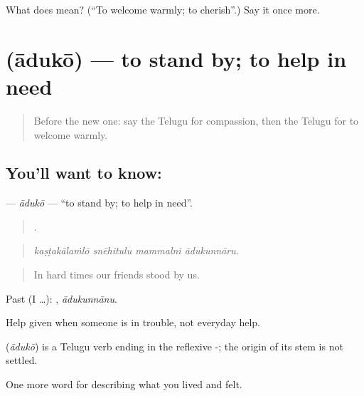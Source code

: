 \begin{tcolorbox}[breakable,colback=teal!4,colframe=teal!35!black,title={Before you move on}]
What does  mean? (\textquotedblleft{}To welcome warmly; to cherish\textquotedblright{}.) Say it once more.
\end{tcolorbox}
\section[\texorpdfstring{\te{ఆదుకో} (ādukō)}{ఆదుకో (ādukō)}]{ (ādukō) — to stand by; to help in need}

\label{lesson:TE-C505-aduko}



\begin{quote}
Before the new one: say the Telugu for compassion, then the Telugu for to welcome warmly.
\end{quote}

\subsection*{You'll want to know: }
\textbf{} — \emph{ādukō} — \textquotedblleft{}to stand by; to help in need\textquotedblright{}.

\begin{quote}
   .
\end{quote}

\begin{quote}
\emph{kaṣṭakālaṁlō snēhitulu mammalni ādukunnāru.}
\end{quote}

\begin{quote}
In hard times our friends stood by us.
\end{quote}

Past (I …): , \emph{ādukunnānu}.

Help given when someone is in trouble, not everyday help.

\begin{cousinweb}
\textbf{} (\emph{ādukō}) is a Telugu verb ending in the reflexive -; the origin of its stem is not settled.
\end{cousinweb}

\begin{grammarlens}[title={What you've built}]
One more word for describing what you lived and felt.
\end{grammarlens}

